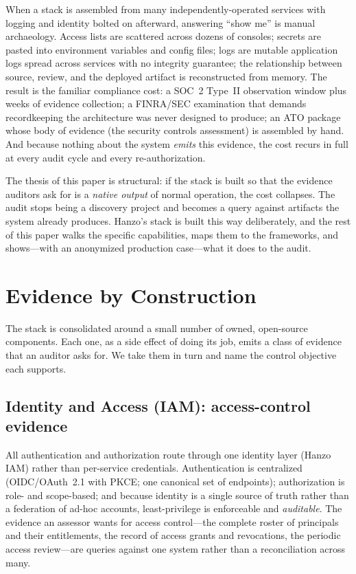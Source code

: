 \documentclass[11pt,letterpaper]{article}
\begin{document}
When a stack is assembled from many independently-operated services with logging and
identity bolted on afterward, answering ``show me'' is manual archaeology. Access
lists are scattered across dozens of consoles; secrets are pasted into environment
variables and config files; logs are mutable application logs spread across services
with no integrity guarantee; the relationship between source, review, and the
deployed artifact is reconstructed from memory. The result is the familiar
compliance cost: a SOC~2 Type~II observation window plus weeks of evidence
collection; a FINRA/SEC examination that demands recordkeeping the architecture was
never designed to produce; an ATO package whose body of evidence (the security
controls assessment) is assembled by hand. And because nothing about the system
\emph{emits} this evidence, the cost recurs in full at every audit cycle and every
re-authorization.

The thesis of this paper is structural: if the stack is built so that the evidence
auditors ask for is a \emph{native output} of normal operation, the cost collapses.
The audit stops being a discovery project and becomes a query against artifacts the
system already produces. Hanzo's stack is built this way deliberately, and the rest
of this paper walks the specific capabilities, maps them to the frameworks, and
shows---with an anonymized production case---what it does to the audit.

\section{Evidence by Construction}

The stack is consolidated around a small number of owned, open-source components.
Each one, as a side effect of doing its job, emits a class of evidence that an
auditor asks for. We take them in turn and name the control objective each supports.

\subsection{Identity and Access (IAM): access-control evidence}

All authentication and authorization route through one identity layer (Hanzo IAM)
rather than per-service credentials. Authentication is centralized
(OIDC/OAuth~2.1 with PKCE; one canonical set of endpoints); authorization is
role- and scope-based; and because identity is a single source of truth rather than
a federation of ad-hoc accounts, least-privilege is enforceable and \emph{auditable}.
The evidence an assessor wants for access control---the complete roster of
principals and their entitlements, the record of access grants and revocations, the
periodic access review---are queries against one system rather than a reconciliation
across many.
\end{document}
